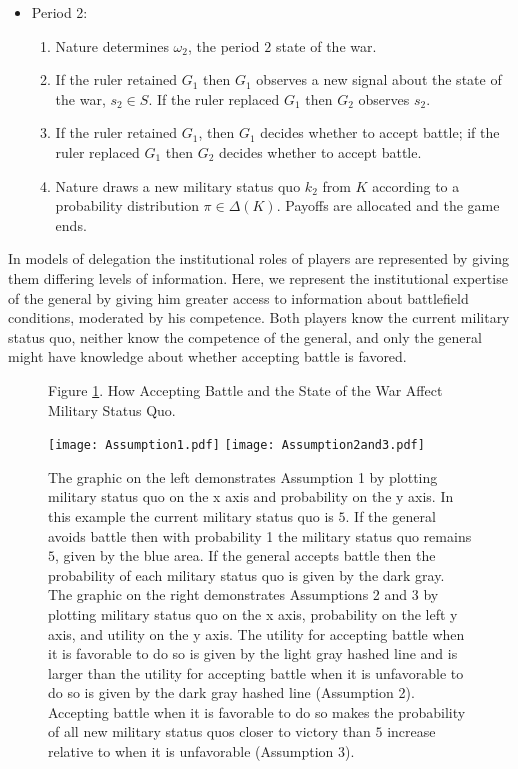 \documentclass[11pt,]{article}
\begin{document}
\begin{itemize}
\item[] Period 2:
\begin{enumerate}
\item Nature determines $\omega_2$, the period $2$ state of the war.
\item If the ruler retained $G_1$ then $G_1$ observes a new signal about the state of the war, $s_2\in S$.  If the ruler replaced $G_1$ then $G_2$ observes $s_2$.
\item If the ruler retained $G_1$, then $G_1$ decides whether to accept battle; if the ruler replaced $G_1$ then $G_2$ decides whether to accept battle.
\item Nature draws a new military status quo $k_2$ from $K$ according to a probability distribution $\pi\in\Delta(K)$.  Payoffs are allocated and the game ends.
\end{enumerate}

\end{itemize}

In models of delegation the institutional roles of players are represented by giving them differing levels of information.  Here, we represent the institutional expertise of the general by giving him greater access to information about battlefield conditions, moderated by his competence.  Both players know the current military status quo, neither know the competence of the general, and only the general might have knowledge about whether accepting battle is favored.  

\begin{figure*}[t] \large Figure \ref{Assumptions}.  How Accepting Battle and the State of the War Affect Military Status Quo.
\begin{center}
\texttt{[image: Assumption1.pdf]}%
\texttt{[image: Assumption2and3.pdf]}%
\end{center}\caption{\footnotesize The graphic on the left demonstrates Assumption 1 by plotting military status quo on the x axis and probability on the y axis.  In this example the current military status quo is $5$.  If the general avoids battle then with probability 1 the military status quo remains $5$, given by the blue area.  If the general accepts battle then the probability of each military status quo is given by the dark gray.  The graphic on the right demonstrates Assumptions 2 and 3 by plotting military status quo on the x axis, probability on the left y axis, and utility on the y axis.  The utility for accepting battle when it is favorable to do so is given by the light gray hashed line and is larger than the utility for accepting battle when it is unfavorable to do so is given by the dark gray hashed line (Assumption 2).  Accepting battle when it is favorable to do so makes the probability of all new military status quos closer to victory than $5$ increase relative to when it is unfavorable (Assumption 3).}\label{Assumptions}
\end{figure*}
\end{document}
